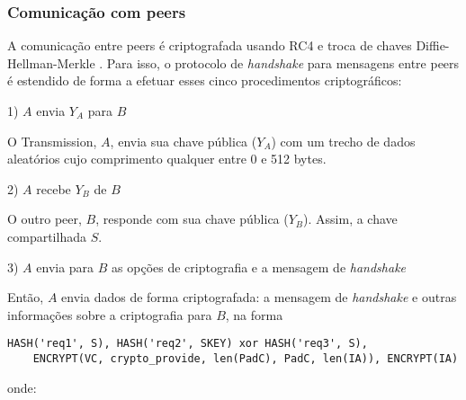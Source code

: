 
\subsubsection*{Comunicação com peers}

A comunicação entre \glspl*{peer} é criptografada usando RC4 e troca de chaves
Diffie-Hellman-Merkle \cite{wikivuze:encription}. Para isso, o protocolo de
\emph{handshake} para mensagens entre \glspl*{peer} é estendido de forma a efetuar
esses cinco procedimentos criptográficos:


1) $A$ envia $Y_A$ para $B$

O Transmission, $A$, envia sua chave pública ($Y_A$) com um trecho de dados aleatórios
cujo comprimento qualquer entre 0 e 512 bytes.


2) $A$ recebe $Y_B$ de $B$

O outro \gls*{peer}, $B$, responde com sua chave pública ($Y_B$). Assim, a chave
compartilhada $S$.


3) $A$ envia para $B$ as opções de criptografia e a mensagem de \emph{handshake}

Então, $A$ envia dados de forma criptografada: a mensagem de \emph{handshake} e outras
informações sobre a criptografia para $B$, na forma

\begin{verbatim}
HASH('req1', S), HASH('req2', SKEY) xor HASH('req3', S),
    ENCRYPT(VC, crypto_provide, len(PadC), PadC, len(IA)), ENCRYPT(IA)
\end{verbatim}

\newpage
onde:

